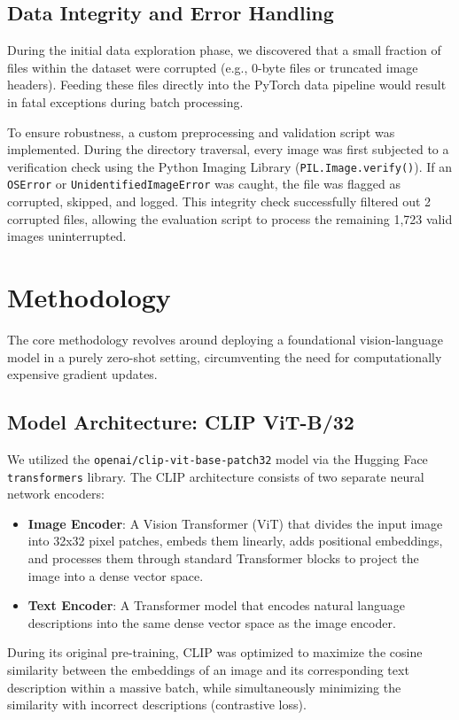 \documentclass[11pt]{article}
\begin{document}
\subsection{Data Integrity and Error Handling}
During the initial data exploration phase, we discovered that a small fraction of files within the dataset were corrupted (e.g., 0-byte files or truncated image headers). Feeding these files directly into the PyTorch data pipeline would result in fatal exceptions during batch processing.

To ensure robustness, a custom preprocessing and validation script was implemented. During the directory traversal, every image was first subjected to a verification check using the Python Imaging Library (\texttt{PIL.Image.verify()}). If an \texttt{OSError} or \texttt{UnidentifiedImageError} was caught, the file was flagged as corrupted, skipped, and logged. This integrity check successfully filtered out 2 corrupted files, allowing the evaluation script to process the remaining 1,723 valid images uninterrupted.

\section{Methodology}

The core methodology revolves around deploying a foundational vision-language model in a purely zero-shot setting, circumventing the need for computationally expensive gradient updates.

\subsection{Model Architecture: CLIP ViT-B/32}
We utilized the \texttt{openai/clip-vit-base-patch32} model via the Hugging Face \texttt{transformers} library. The CLIP architecture consists of two separate neural network encoders:
\begin{itemize}
    \item \textbf{Image Encoder}: A Vision Transformer (ViT) that divides the input image into 32x32 pixel patches, embeds them linearly, adds positional embeddings, and processes them through standard Transformer blocks to project the image into a dense vector space.
    \item \textbf{Text Encoder}: A Transformer model that encodes natural language descriptions into the same dense vector space as the image encoder.
\end{itemize}

During its original pre-training, CLIP was optimized to maximize the cosine similarity between the embeddings of an image and its corresponding text description within a massive batch, while simultaneously minimizing the similarity with incorrect descriptions (contrastive loss).
\end{document}

